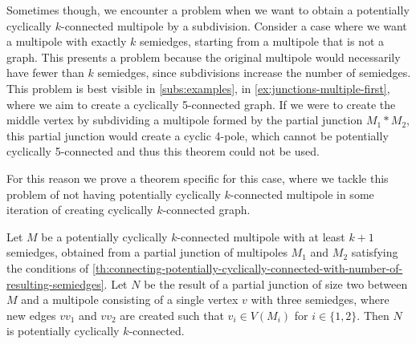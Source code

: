 \documentclass[12pt, twoside]{book}
\begin{document}
Sometimes though, we encounter a problem when we want to obtain a potentially cyclically $k$-connected multipole by a subdivision. Consider a case where we want a multipole with exactly $k$ semiedges, starting from a multipole that is not a graph. This presents a problem because the original multipole would necessarily have fewer than $k$ semiedges, since subdivisions increase the number of semiedges. This problem is best visible in \cref{subs:examples}, in \cref{ex:junctions-multiple-first}, where we aim to create a cyclically 5-connected graph. If we were to create the middle vertex by subdividing a multipole formed by the partial junction $M_1*M_2$, this partial junction would create a cyclic 4-pole, which cannot be potentially cyclically 5-connected and thus this theorem could not be used.

For this reason we prove a theorem specific for this case, where we tackle this problem of not having potentially cyclically $k$-connected multipole in some iteration of creating cyclically $k$-connected graph.

\begin{lemma}\label{lem:adding-point-to-partial-junction-of-two}
	Let $M$ be a potentially cyclically $k$-connected multipole with at least $k+1$ semiedges, obtained from a partial junction of multipoles $M_1$ and $M_2$ satisfying the conditions of \cref{th:connecting-potentially-cyclically-connected-with-number-of-resulting-semiedges}. Let $N$ be the result of a partial junction of size two between $M$ and a multipole consisting of a single vertex $v$ with three semiedges, where new edges $vv_1$ and $vv_2$ are created such that $v_i\in V(M_i)$ for $i\in\{1,2\}$. Then $N$ is potentially cyclically $k$-connected.
\end{lemma}
\end{document}
